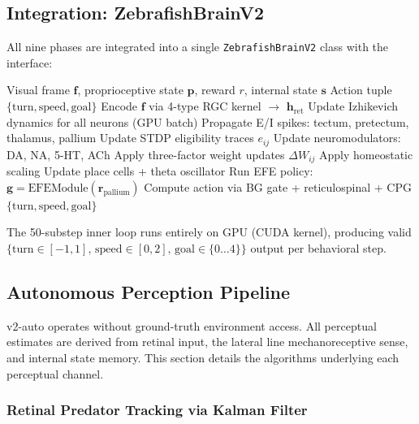 \documentclass[11pt,a4paper]{article}
\begin{document}
\subsection{Integration: ZebrafishBrainV2}\label{sec:integration}

All nine phases are integrated into a single \texttt{ZebrafishBrainV2}
class with the interface:

\begin{algorithm}[H]
\caption{ZebrafishBrainV2.step() --- Per-Behavioral-Step Update}
\label{alg:brain_step}
\begin{algorithmic}[1]
\REQUIRE Visual frame $\mathbf{f}$, proprioceptive state $\mathbf{p}$,
  reward $r$, internal state $\mathbf{s}$
\ENSURE Action tuple $\{\mathrm{turn}, \mathrm{speed}, \mathrm{goal}\}$
 
  \STATE Encode $\mathbf{f}$ via 4-type RGC kernel $\to$ $\mathbf{h}_\mathrm{ret}$
  \STATE Update Izhikevich dynamics for all neurons (GPU batch)
  \STATE Propagate E/I spikes: tectum, pretectum, thalamus, pallium
  \STATE Update STDP eligibility traces $e_{ij}$
\ENDFOR
\STATE Update neuromodulators: DA, NA, 5-HT, ACh
\STATE Apply three-factor weight updates $\Delta W_{ij}$
\STATE Apply homeostatic scaling
\STATE Update place cells + theta oscillator
\STATE Run EFE policy: $\mathbf{g} = \mathrm{EFEModule}(\mathbf{r}_\mathrm{pallium})$
\STATE Compute action via BG gate + reticulospinal + CPG
\RETURN $\{\mathrm{turn}, \mathrm{speed}, \mathrm{goal}\}$
\end{algorithmic}
\end{algorithm}

The 50-substep inner loop runs entirely on GPU (CUDA kernel),
producing valid $\{\mathrm{turn} \in [-1,1],\, \mathrm{speed} \in [0,2],\,
\mathrm{goal} \in \{0\ldots4\}\}$ output per behavioral step.

\subsection{Autonomous Perception Pipeline}\label{sec:autonomous_perception}

v2-auto operates without ground-truth environment access.
All perceptual estimates are derived from retinal input, the lateral
line mechanoreceptive sense, and internal state memory.
This section details the algorithms underlying each perceptual channel.

\subsubsection{Retinal Predator Tracking via Kalman Filter}
\end{document}
